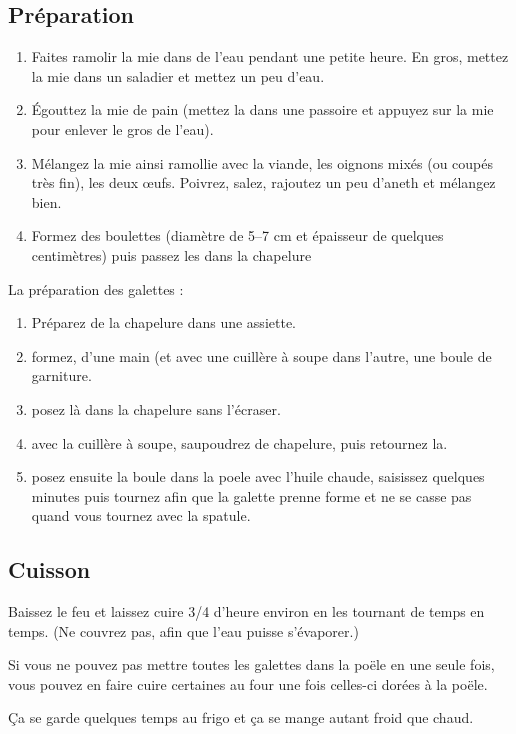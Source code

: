 \subsection*{Préparation}
\begin{enumerate}
\item Faites ramolir la mie dans de l'eau pendant une petite heure. En gros, mettez la mie dans un saladier et mettez un peu d'eau.
\item Égouttez la mie de pain (mettez la dans une passoire et appuyez sur la mie pour enlever le gros de l'eau).
\item Mélangez la mie ainsi ramollie avec la viande, les oignons mixés (ou coupés très fin), les deux œufs. Poivrez, salez, rajoutez un peu d'aneth et mélangez bien.
\item  Formez des boulettes (diamètre de 5--7 cm et épaisseur de quelques centimètres) puis passez les dans la chapelure
\end{enumerate}

La préparation des galettes :

\begin{enumerate}
\item Préparez de la chapelure dans une assiette.
\item formez, d'une main (et avec une cuillère à soupe dans l'autre, une boule de garniture.
\item posez là dans la chapelure sans l'écraser.
\item avec la cuillère à soupe, saupoudrez de chapelure, puis retournez la.
\item posez ensuite la boule dans la poele avec l'huile chaude, saisissez quelques minutes puis tournez afin que la galette prenne forme et ne se casse pas quand vous tournez avec la spatule.
\end{enumerate}


\subsection*{Cuisson}

Baissez le feu et laissez cuire 3/4 d'heure environ en les tournant de temps en temps. (Ne couvrez pas, afin que l'eau puisse s'évaporer.)

Si vous ne pouvez pas mettre toutes les galettes dans la poële en une seule fois, vous pouvez en faire cuire certaines au four une fois celles-ci dorées à la poële.

\begin{remarque}
Ça se garde quelques temps au frigo et ça se mange autant froid que chaud.
\end{remarque}

